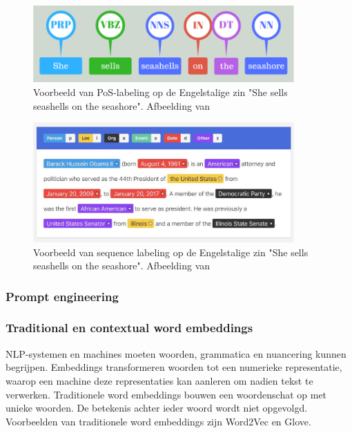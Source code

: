 \begin{figure}[H]
	\begin{center}
		\includegraphics[width=10cm]{img/poslabeling.png}
	\end{center}
	\caption{Voorbeeld van PoS-labeling op de Engelstalige zin "She sells seashells on the seashore". Afbeelding van \textcite{Bilisci2021} }
	\label{fig:pos}
\end{figure}

\begin{figure}[H]
	\begin{center}
		\includegraphics[width=10cm]{img/nerlabeling.jpg}
	\end{center}
	\caption{Voorbeeld van sequence labeling op de Engelstalige zin "She sells seashells on the seashore". Afbeelding van \textcite{Bilisci2021} }
	\label{fig:ner}
\end{figure}


\subsubsection{Prompt engineering}


\subsubsection{Traditional en contextual word embeddings}

NLP-systemen en machines moeten woorden, grammatica en nuancering kunnen begrijpen. Embeddings transformeren woorden tot een numerieke representatie, waarop een machine deze representaties kan aanleren om nadien tekst te verwerken. Traditionele word embeddings bouwen een woordenschat op met unieke woorden. De betekenis achter ieder woord wordt niet opgevolgd. Voorbeelden van traditionele word embeddings zijn Word2Vec en Glove.

